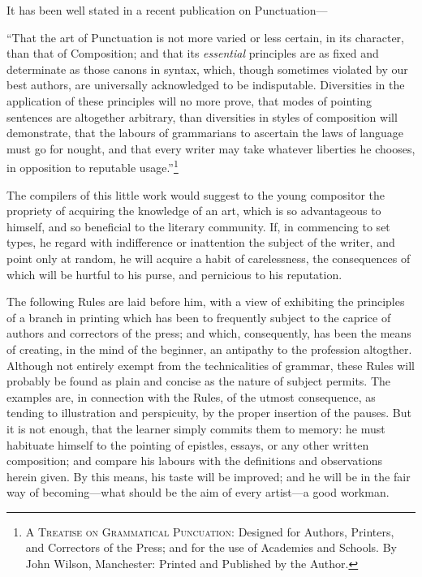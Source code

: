 It has been well stated in a recent publication on Punctuation---

\begin{example}
    ``That the art of Punctuation is not more varied or less certain, in its
    character, than that of Composition; and that its \emph{essential}
    principles are as fixed and determinate as those canons in syntax, which,
    though sometimes violated by our best authors, are universally acknowledged
    to be indisputable. Diversities in the application of these principles will
    no more prove, that modes of pointing sentences are altogether arbitrary,
    than diversities in styles of composition will demonstrate, that the labours
    of grammarians to ascertain the laws of language must go for nought, and
    that every writer may take whatever liberties he chooses, in opposition to
    reputable usage.''\footnote{\textsc{A Treatise on Grammatical Puncuation}:
    Designed for Authors, Printers, and Correctors of the Press; and for the use
    of Academies and Schools. By John Wilson, Manchester: Printed and Published
    by the Author.}
\end{example}

The compilers of this little work would suggest to the young compositor
the propriety of acquiring the knowledge of an art, which is so advantageous to
himself, and so beneficial to the literary community. If, in commencing to set
types, he regard with indifference or inattention the subject of the writer, and
point only at random, he will acquire a habit of carelessness, the consequences
of which will be hurtful to his purse, and pernicious to his reputation.

The following Rules are laid before him, with a view of exhibiting the
principles of a branch in printing which has been to frequently subject to the
caprice of authors and correctors of the press; and which, consequently, has
been the means of creating, in the mind of the beginner, an antipathy to the
profession altogther. Although not entirely exempt from the technicalities of
grammar, these Rules will probably be found as plain and concise as the nature
of subject permits. The examples are, in connection with the Rules, of the
utmost consequence, as tending to illustration and perspicuity, by the proper
insertion of the pauses. But it is not enough, that the learner simply commits
them to memory: he must habituate himself to the pointing of epistles, essays,
or any other written composition; and compare his labours with the definitions
and observations herein given. By this means, his taste will be improved; and he
will be in the fair way of becoming---what should be the aim of every artist---a
good workman.

